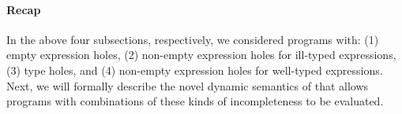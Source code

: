 





\paragraph{Recap}
%
In the above four subsections, respectively, we considered programs with:
%
(1) empty expression holes,
%
(2) non-empty expression holes for ill-typed expressions,
%
(3) type holes, and
%
(4) non-empty expression holes for well-typed expressions.
%
Next, we will formally describe the novel dynamic semantics of \HazelnutLive{}
that allows programs with combinations of these kinds of incompleteness to be
evaluated.
